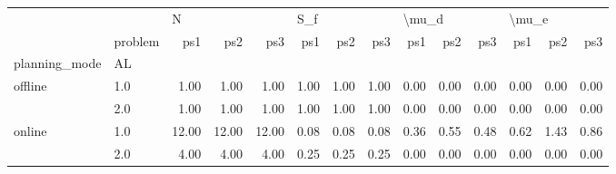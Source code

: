 \begin{tabular}{llrrrrrrrrrrrr}
\toprule
       & {} & \multicolumn{3}{l}{N} & \multicolumn{3}{l}{S\_f} & \multicolumn{3}{l}{\textbackslash mu\_d} & \multicolumn{3}{l}{\textbackslash mu\_e} \\
       & problem &   ps1 &   ps2 &   ps3 &  ps1 &  ps2 &  ps3 &   ps1 &  ps2 &  ps3 &   ps1 &  ps2 &  ps3 \\
planning\_mode & AL &       &       &       &      &      &      &       &      &      &       &      &      \\
\midrule
offline & 1.0 &  1.00 &  1.00 &  1.00 & 1.00 & 1.00 & 1.00 &  0.00 & 0.00 & 0.00 &  0.00 & 0.00 & 0.00 \\
       & 2.0 &  1.00 &  1.00 &  1.00 & 1.00 & 1.00 & 1.00 &  0.00 & 0.00 & 0.00 &  0.00 & 0.00 & 0.00 \\
online & 1.0 & 12.00 & 12.00 & 12.00 & 0.08 & 0.08 & 0.08 &  0.36 & 0.55 & 0.48 &  0.62 & 1.43 & 0.86 \\
       & 2.0 &  4.00 &  4.00 &  4.00 & 0.25 & 0.25 & 0.25 &  0.00 & 0.00 & 0.00 &  0.00 & 0.00 & 0.00 \\
\bottomrule
\end{tabular}
